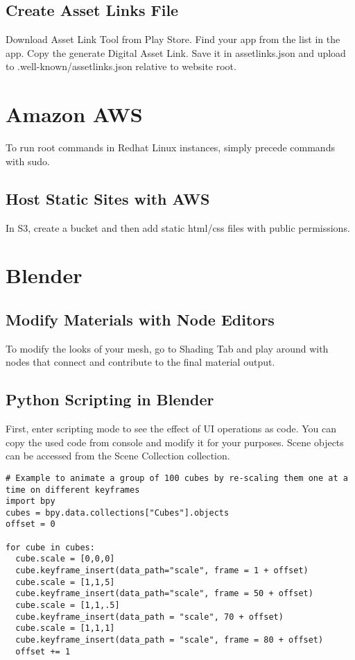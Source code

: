 \documentclass{article}
\begin{document}
\subsection{Create Asset Links File}
Download Asset Link Tool from Play Store. Find your app from the list in the app. Copy the generate Digital Asset Link. Save it in assetlinks.json and upload to .well-known/assetlinks.json relative to website root. 


\section{Amazon AWS}
To run root commands in Redhat Linux instances, simply precede commands with sudo. 

\subsection{Host Static Sites with AWS}
In S3, create a bucket and then add static html/css files with public permissions. 


\section{Blender}

\subsection{Modify Materials with Node Editors}
To modify the looks of your mesh, go to Shading Tab and play around with nodes that connect and contribute to the final material output. 
\subsection{Python Scripting in Blender}
First, enter scripting mode to see the effect of UI operations as code. You can copy the used code from console and modify it for your purposes. Scene objects can be accessed from the Scene Collection collection. 
\begin{lstlisting}
# Example to animate a group of 100 cubes by re-scaling them one at a time on different keyframes
import bpy
cubes = bpy.data.collections["Cubes"].objects
offset = 0

for cube in cubes:
  cube.scale = [0,0,0]
  cube.keyframe_insert(data_path="scale", frame = 1 + offset)
  cube.scale = [1,1,5]
  cube.keyframe_insert(data_path="scale", frame = 50 + offset)
  cube.scale = [1,1,.5]
  cube.keyframe_insert(data_path = "scale", 70 + offset)
  cube.scale = [1,1,1]
  cube.keyframe_insert(data_path = "scale", frame = 80 + offset)
  offset += 1


\end{lstlisting}
\end{document}
